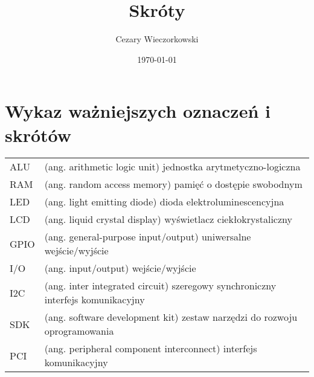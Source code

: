\documentclass[./main.tex]{subfiles}
\author{Cezary Wieczorkowski}
\date{\today}
\title{Skróty}
\begin{document}
\section*{Wykaz ważniejszych oznaczeń i skrótów}

\begin{tabular}{l p{}}
ALU & (ang. arithmetic logic unit) jednostka arytmetyczno-logiczna\\[0pt]
RAM & (ang. random access memory) pamięć o dostępie swobodnym\\[0pt]
LED & (ang. light emitting diode) dioda elektroluminescencyjna\\[0pt]
LCD & (ang. liquid crystal display) wyświetlacz ciekłokrystaliczny\\[0pt]
GPIO & (ang. general-purpose input/output) uniwersalne wejście/wyjście\\[0pt]
I/O & (ang. input/output) wejście/wyjście\\[0pt]
I2C & (ang. inter integrated circuit) szeregowy synchroniczny interfejs komunikacyjny\\[0pt]
SDK & (ang. software development kit) zestaw narzędzi do rozwoju oprogramowania\\[0pt]
PCI & (ang. peripheral component interconnect) interfejs komunikacyjny\\[0pt]
\end{tabular}
\end{document}
